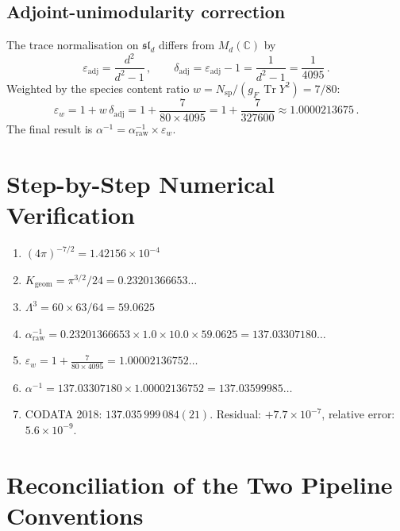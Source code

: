 \documentclass[11pt]{article}
\newcommand{\Tr}{\operatorname{Tr}}
\newcommand{\slp}{\mathfrak{sl}}
\begin{document}
\subsection{Adjoint-unimodularity correction}

The trace normalisation on $\slp_d$ differs from $M_d(\mathbb{C})$ by
\[
\varepsilon_{\mathrm{adj}} = \frac{d^2}{d^2-1}\,,
\qquad
\delta_{\mathrm{adj}} = \varepsilon_{\mathrm{adj}} - 1
= \frac{1}{d^2-1} = \frac{1}{4095}\,.
\]
Weighted by the species content ratio $w = N_{\mathrm{sp}}/(g_F\,\Tr Y^2) = 7/80$:
\[
\varepsilon_w = 1 + w\,\delta_{\mathrm{adj}}
= 1 + \frac{7}{80 \times 4095}
= 1 + \frac{7}{327600}
\approx 1.0000213675\,.
\]
The final result is $\alpha^{-1} = \alpha^{-1}_{\mathrm{raw}} \times \varepsilon_w$.


\section{Step-by-Step Numerical Verification}

\begin{enumerate}
\item $(4\pi)^{-7/2} = 1.42156 \times 10^{-4}$

\item $K_{\mathrm{geom}} = \pi^{3/2}/24 = 0.23201366653\ldots$

\item $\Lambda^3 = 60 \times 63/64 = 59.0625$

\item $\alpha^{-1}_{\mathrm{raw}}
      = 0.23201366653 \times 1.0 \times 10.0 \times 59.0625
      = 137.03307180\ldots$

\item $\varepsilon_w = 1 + \frac{7}{80 \times 4095} = 1.00002136752\ldots$

\item $\alpha^{-1} = 137.03307180 \times 1.00002136752 = 137.03599985\ldots$

\item CODATA 2018: $137.035\,999\,084(21)$.
      Residual: $+7.7 \times 10^{-7}$,\;
      relative error: $5.6 \times 10^{-9}$.
\end{enumerate}


\section{Reconciliation of the Two Pipeline Conventions}
\end{document}
